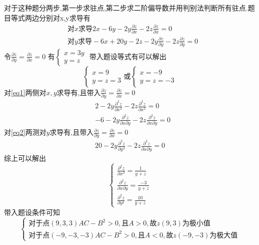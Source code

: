 \documentclass[12pt, a4paper, oneside, UTF8]{ctexbook}
\begin{document}
\begin{enumerate}[label=\arabic*.,start=9]
    \begin{solution}
    对于这种题分两步,第一步求驻点,第二步求二阶偏导数并用判别法判断所有驻点.题目等式两边分别对{x,y}求导有 
    \begin{align}
        & \text{对}x\text{求导} 2x-6y-2y\frac{\partial z}{\partial x} - 2z\frac{\partial z}{\partial x} = 0 \tag{1} \label{eq1} \\
        & \text{对}y\text{求导} -6x + 20y - 2z - 2y\frac{\partial z}{\partial y} - 2z\frac{\partial z}{\partial y} = 0 \tag{2} \label{eq2}
    \end{align}
    令$\displaystyle \frac{\partial z}{\partial y}=\frac{\partial z}{\partial x}=0$ 有$\begin{cases}
        x = 3y \\
        y = z
    \end{cases}$ 带入题设等式有可以解出
    $$
    \begin{cases}
        x = 9 \\
        y = z = 3 
    \end{cases} \text{或}
    \begin{cases}
        x = -9 \\
        y = z = -3
    \end{cases}
    $$
    对\eqref{eq1}两侧对$x,y$求导有,且带入$\displaystyle \frac{\partial z}{\partial y}=\frac{\partial z}{\partial x}=0$
    \begin{align}
        & 2 - 2y\frac{\partial^2 z}{\partial x^2} - 2z\frac{\partial^2 z}{\partial x^2} = 0 \tag{3} \\
        & -6 - 2y\frac{\partial^2 z}{\partial x\partial y} - 2z\frac{\partial^2 z}{\partial x\partial y} = 0 \tag{4}
    \end{align}
    对\eqref{eq2}两测对$y$求导有,且带入$\displaystyle \frac{\partial z}{\partial y}=\frac{\partial z}{\partial x}=0$
    \begin{align}
        20 - 2y\frac{\partial^2 z}{\partial y^2}-2z\frac{\partial^2 z}{\partial x\partial y} = 0 \tag{5}
    \end{align}
    综上可以解出
    $$
    \begin{cases}
        \displaystyle \frac{\partial^2 z}{\partial x^2} = \frac{1}{y+z} \\
        \displaystyle \frac{\partial^2 z}{\partial x\partial y} = \frac{-3}{y+z} \\
        \displaystyle \frac{\partial^2 z}{\partial y^2} = \frac{10}{y+z}
    \end{cases}
    $$
    带入题设条件可知
    $$
    \begin{cases}
        \text{对于点}(9,3,3) AC-B^2 > 0,\text{且} A > 0,\text{故}z(9,3)\text{为极小值} \\
        \text{对于点}(-9,-3,-3) AC-B^2 > 0,\text{且} A < 0,\text{故}z(-9,-3)\text{为极大值}
    \end{cases}
    $$
    \end{solution}
\end{enumerate}
\end{document}
